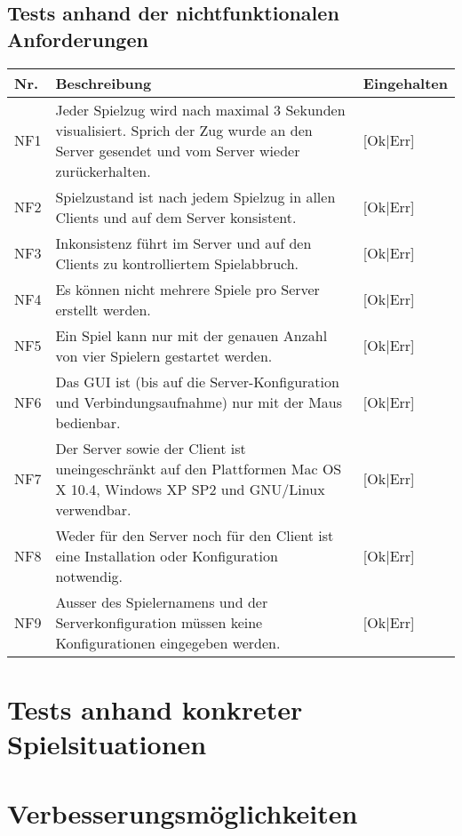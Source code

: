 \documentclass[12pt,halfparskip]{scrartcl}
\begin{document}

\subsection{Tests anhand der nichtfunktionalen Anforderungen}\label{sub:tests_anhand_der_nichtfunktionalen_anforderungen} %
\begin {tabular}{l p{11cm} l}
\toprule
\textbf{Nr.} & \textbf{Beschreibung} & \textbf{Eingehalten} \\
\midrule
NF1 & Jeder Spielzug wird nach maximal 3 Sekunden visualisiert. Sprich der Zug wurde an den Server gesendet und vom Server wieder zurückerhalten. & [Ok|Err] \\
NF2 & Spielzustand ist nach jedem Spielzug in allen Clients und auf dem Server konsistent. & [Ok|Err] \\
NF3 & Inkonsistenz führt im Server und auf den Clients zu kontrolliertem Spielabbruch. & [Ok|Err] \\
NF4 & Es können nicht mehrere Spiele pro Server erstellt werden. & [Ok|Err] \\
NF5 & Ein Spiel kann nur mit der genauen Anzahl von vier Spielern gestartet werden. & [Ok|Err] \\
NF6 & Das GUI ist (bis auf die Server-Konfiguration und Verbindungsaufnahme) nur mit der Maus bedienbar. & [Ok|Err] \\
NF7 & Der Server sowie der Client ist uneingeschränkt auf den Plattformen Mac OS X 10.4, Windows XP SP2 und GNU/Linux verwendbar. & [Ok|Err] \\
NF8 & Weder für den Server noch für den Client ist eine Installation oder Konfiguration notwendig. & [Ok|Err] \\
NF9 & Ausser des Spielernamens und der Serverkonfiguration müssen keine Konfigurationen eingegeben werden. & [Ok|Err] \\
\bottomrule
\end{tabular}

\section{Tests anhand konkreter Spielsituationen}\label{sec:tests_anhand_konkreter_spielsituationen} %


\section{Verbesserungsmöglichkeiten} %
\label{sec:verbesserungsmöglichkeiten}
\end{document}

